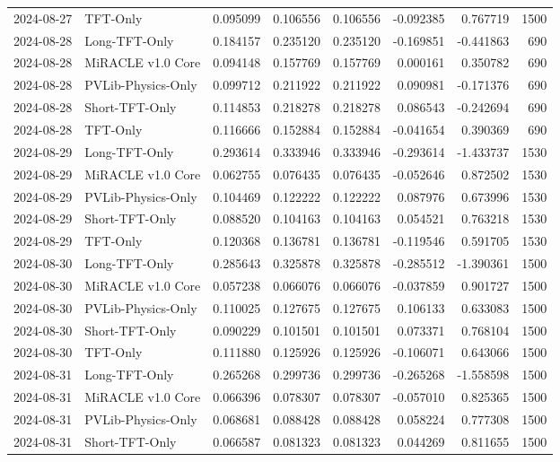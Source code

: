 \begin{tabular}{llrrrrrr}
2024-08-27 & TFT-Only & 0.095099 & 0.106556 & 0.106556 & -0.092385 & 0.767719 & 1500 \\
2024-08-28 & Long-TFT-Only & 0.184157 & 0.235120 & 0.235120 & -0.169851 & -0.441863 & 690 \\
2024-08-28 & MiRACLE v1.0 Core & 0.094148 & 0.157769 & 0.157769 & 0.000161 & 0.350782 & 690 \\
2024-08-28 & PVLib-Physics-Only & 0.099712 & 0.211922 & 0.211922 & 0.090981 & -0.171376 & 690 \\
2024-08-28 & Short-TFT-Only & 0.114853 & 0.218278 & 0.218278 & 0.086543 & -0.242694 & 690 \\
2024-08-28 & TFT-Only & 0.116666 & 0.152884 & 0.152884 & -0.041654 & 0.390369 & 690 \\
2024-08-29 & Long-TFT-Only & 0.293614 & 0.333946 & 0.333946 & -0.293614 & -1.433737 & 1530 \\
2024-08-29 & MiRACLE v1.0 Core & 0.062755 & 0.076435 & 0.076435 & -0.052646 & 0.872502 & 1530 \\
2024-08-29 & PVLib-Physics-Only & 0.104469 & 0.122222 & 0.122222 & 0.087976 & 0.673996 & 1530 \\
2024-08-29 & Short-TFT-Only & 0.088520 & 0.104163 & 0.104163 & 0.054521 & 0.763218 & 1530 \\
2024-08-29 & TFT-Only & 0.120368 & 0.136781 & 0.136781 & -0.119546 & 0.591705 & 1530 \\
2024-08-30 & Long-TFT-Only & 0.285643 & 0.325878 & 0.325878 & -0.285512 & -1.390361 & 1500 \\
2024-08-30 & MiRACLE v1.0 Core & 0.057238 & 0.066076 & 0.066076 & -0.037859 & 0.901727 & 1500 \\
2024-08-30 & PVLib-Physics-Only & 0.110025 & 0.127675 & 0.127675 & 0.106133 & 0.633083 & 1500 \\
2024-08-30 & Short-TFT-Only & 0.090229 & 0.101501 & 0.101501 & 0.073371 & 0.768104 & 1500 \\
2024-08-30 & TFT-Only & 0.111880 & 0.125926 & 0.125926 & -0.106071 & 0.643066 & 1500 \\
2024-08-31 & Long-TFT-Only & 0.265268 & 0.299736 & 0.299736 & -0.265268 & -1.558598 & 1500 \\
2024-08-31 & MiRACLE v1.0 Core & 0.066396 & 0.078307 & 0.078307 & -0.057010 & 0.825365 & 1500 \\
2024-08-31 & PVLib-Physics-Only & 0.068681 & 0.088428 & 0.088428 & 0.058224 & 0.777308 & 1500 \\
2024-08-31 & Short-TFT-Only & 0.066587 & 0.081323 & 0.081323 & 0.044269 & 0.811655 & 1500 \\

\end{tabular}
